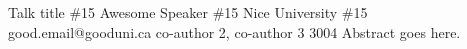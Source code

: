 \documentclass[12pt,a4paper,figuresright]{book}
\begin{document}
\begin{talk}
	{Talk title \#15}%
	{Awesome Speaker \#15}%
	{Nice University \#15}%
	{good.email@gooduni.ca}%
	{co-author 2, co-author 3}%
	{}%
	{}%
	{3004}%
	{}%
	Abstract goes here.
\end{talk}

\fi
 
 






%

\end{document}
